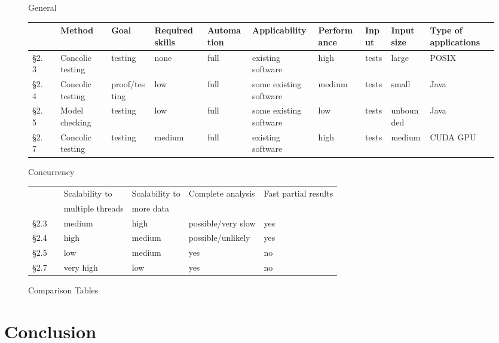 \documentclass[10pt]{llncs}
\begin{document}
\begin{landscape}
\begin{figure}
	
	\vspace{1cm}
	
	General
	
	\vspace{5mm}
	
	\begin{tabular}{l l l l l l l l l l l}
		& & Method & Goal & Required skills & Automation & Applicability & Performance & Input & Input size & Type of applications \\
		\hline
		§2.3 & \cite{base3} & Concolic testing & testing & none & full & existing software & high & tests & large & POSIX \\
		§2.4 & \cite{base4} & Concolic testing & proof/testing & low & full & some existing software & medium & tests & small & Java \\
		§2.5 & \cite{base5} & Model checking & testing & low & full & some existing software & low & tests & unbounded & Java \\
		§2.7 & \cite{base7} & Concolic testing & testing & medium & full & existing software & high & tests & medium & CUDA GPU
	\end{tabular}
	
	\vspace{1cm}
	
	Concurrency
	
	\vspace{5mm}
	
	\begin{tabular}{l l l l l l}
		& & Scalability to  &  Scalability to & Complete analysis & Fast partial results \\
		& & multiple threads & more data & & \\
		\hline
		§2.3 & \cite{base3} & medium & high & possible/very slow & yes \\
		§2.4 & \cite{base4} & high & medium & possible/unlikely & yes\\
		§2.5 & \cite{base5} & low & medium & yes & no \\
		§2.7 & \cite{base7} & very high & low & yes & no \\
	\end{tabular}
	
	\caption{Comparison Tables}
	\label{comp table}
\end{figure}
\end{landscape}

\section{Conclusion}
\label{conclusion}
\end{document}
